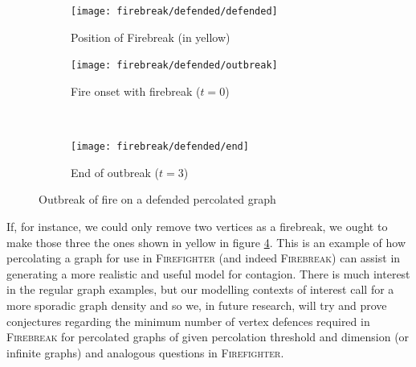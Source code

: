 \documentclass[../report.tex]{subfiles}
\begin{document}
\begin{figure}[ht] 
\begin{centering}
  \begin{subfigure}{0.4\linewidth}
    \centering
    \texttt{[image: firebreak/defended/defended]} 
    \caption{Position of Firebreak (in yellow)} 
    \label{fig:defended} 
  \end{subfigure}%
  \begin{subfigure}{0.4\linewidth}
    \centering
    \texttt{[image: firebreak/defended/outbreak]} 
    \caption{Fire onset with firebreak ($t=0$)} 
    \label{fig:afterperc_break} 
  \end{subfigure}\\[1ex] 
  \begin{subfigure}{0.4\linewidth}
    \centering
    \texttt{[image: firebreak/defended/end]} 
    \caption{End of outbreak ($t=3$)} 
    \label{fig:end_defended} 
  \end{subfigure} 
  \caption{Outbreak of fire on a defended percolated graph}
  \label{fig:percolated_defended} 
  \end{centering}
\end{figure}

If, for instance, we could only remove two vertices as a firebreak, we ought to make those three the ones shown in yellow in figure \ref{fig:percolated_defended}. This is an example of how percolating a graph for use in {\scshape Firefighter} (and indeed {\scshape Firebreak}) can assist in generating a more realistic and useful model for contagion. There is much interest in the regular graph examples, but our modelling contexts of interest call for a more sporadic graph density and so we, in future research, will try and prove conjectures regarding the minimum number of vertex defences required in {\scshape Firebreak} for percolated graphs of given percolation threshold and dimension (or infinite graphs) and analogous questions in {\scshape Firefighter}.
\end{document}
